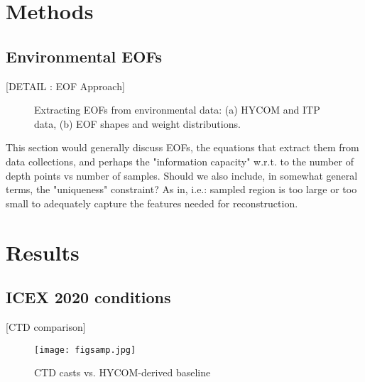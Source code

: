 \section{\label{sec:2} Methods}

\subsection{\label{subsec:2:1} Environmental EOFs}

{\color{red}[DETAIL : EOF Approach]}

\begin{figure}[ht]

\caption{\label{fig:FIG1}{Extracting EOFs from environmental data: (a) HYCOM and ITP data, (b) EOF shapes and weight distributions.}}

\end{figure}

This section would generally discuss EOFs, the equations that extract them from data collections, and perhaps the "information capacity" w.r.t. to the number of depth points vs number of samples. Should we also include, in somewhat general terms, the "uniqueness" constraint? As in, i.e.: sampled region is too large or too small to adequately capture the features needed for reconstruction.



\section{\label{sec:3} Results}

\subsection{\label{subsec:3:1} ICEX 2020 conditions}
{\color{red}[CTD comparison]}

\begin{figure}[ht]
\texttt{[image: figsamp.jpg]}
\caption{\label{fig:FIG2}{CTD casts vs. HYCOM-derived baseline}}
\end{figure}

